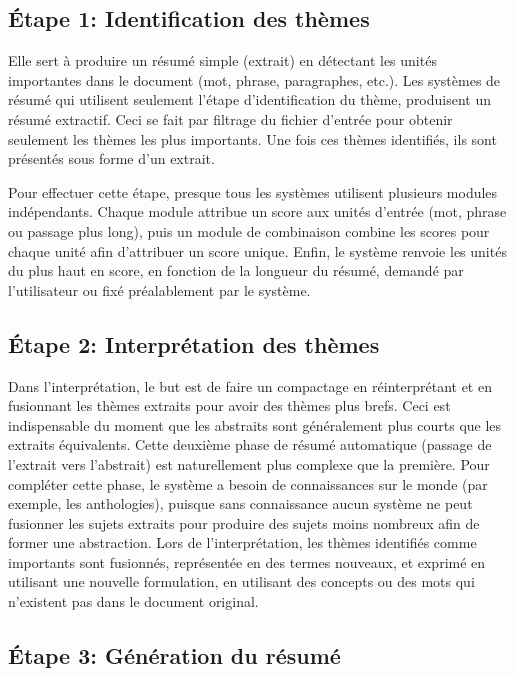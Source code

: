 \documentclass[a4paper,12pt,oneside]{../use/ESIthesis}
\begin{document}
\subsection{Étape 1: Identification des thèmes}

Elle sert à produire un résumé simple (extrait) en détectant les unités importantes dans le document (mot, phrase, paragraphes, etc.). 
Les systèmes de résumé qui utilisent seulement l'étape d'identification du thème, produisent un résumé extractif. 
Ceci se fait par filtrage du fichier d'entrée pour obtenir seulement les thèmes les plus importants. 
Une fois ces thèmes identifiés, ils sont présentés sous forme d'un extrait.

Pour effectuer cette étape, presque tous les systèmes utilisent plusieurs modules indépendants. 
Chaque module attribue un score aux unités d'entrée (mot, phrase ou passage plus long), puis un module de combinaison combine les scores pour chaque unité afin d'attribuer un score unique. 
Enfin, le système renvoie les unités du plus haut en score, en fonction de la longueur du résumé, demandé par l'utilisateur ou fixé préalablement par le système.

\subsection{Étape 2: Interprétation des thèmes}

Dans l'interprétation, le but est de faire un compactage en réinterprétant et en fusionnant les thèmes extraits pour avoir des thèmes plus brefs. 
Ceci est indispensable du moment que les abstraits sont généralement plus courts que les extraits équivalents. 
Cette deuxième phase de résumé automatique (passage de l'extrait vers l'abstrait) est naturellement plus complexe que la première. 
Pour compléter cette phase, le système a besoin de connaissances sur le monde (par exemple, les anthologies), puisque sans connaissance aucun système ne peut fusionner les sujets extraits pour produire des sujets moins nombreux afin de former une abstraction. 
Lors de l'interprétation, les thèmes identifiés comme importants sont fusionnés, représentée en des termes nouveaux, et exprimé en utilisant une nouvelle formulation, en utilisant des concepts ou des mots qui n'existent pas dans le document original. 

\subsection{Étape 3: Génération du résumé}
\end{document}
